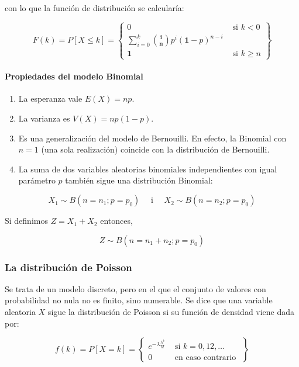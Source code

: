\documentclass[
]{article}
\providecommand{\tightlist}{%
  \setlength{\itemsep}{0pt}\setlength{\parskip}{0pt}}
\begin{document}
con lo que la función de distribución se calcularía:

\[
F(k)=P[X \leq k]=\left\{\begin{array}{cc}
0 & \text { si } k<0 \\
\sum_{i=0}^{k}\binom{\mathbf{i}}{\mathbf{n}} p^{i}(\mathbf{1}-p)^{n-i} \\
\mathbf{1} & \text { si } k \geq n
\end{array}\right\}
\]

\paragraph{Propiedades del modelo Binomial}\label{propiedades-del-modelo-binomial}

\begin{enumerate}
\def\labelenumi{\arabic{enumi}.}
\tightlist
\item
  La esperanza vale \(E(X)=n p\).
\item
  La varianza es \(V(X)=n p(1-p)\).
\item
  Es una generalización del modelo de Bernouilli. En efecto, la Binomial con \(n=1\) (una sola realización) coincide con la distribución de Bernouilli.
\item
  La suma de dos variables aleatorias binomiales independientes con igual parámetro \(p\) también sigue una distribución Binomial:
\end{enumerate}

\[
X_{1} \sim B\left(n=n_{1} ; p=p_{0}\right) \quad \text { i } \quad X_{2} \sim B\left(n=n_{2} ; p=p_{0}\right)
\]

Si definimos \(Z=X_{1}+X_{2}\) entonces,

\[
Z \sim B\left(n=n_{1}+n_{2} ; p=p_{0}\right)
\]

\subsubsection{La distribución de Poisson}\label{la-distribuciuxf3n-de-poisson}

Se trata de un modelo discreto, pero en el que el conjunto de valores con probabilidad no nula no es finito, sino numerable. Se dice que una variable aleatoria \(X\) sigue la distribución de Poisson si su función de densidad viene dada por:

\[
f(k)=P[X=k]=\left\{\begin{array}{ll}
e^{-\lambda \frac{\lambda^{k}}{k!}} & \text { si } k=0,12, \ldots \\
0 & \text { en caso contrario }
\end{array}\right\}
\]
\end{document}
